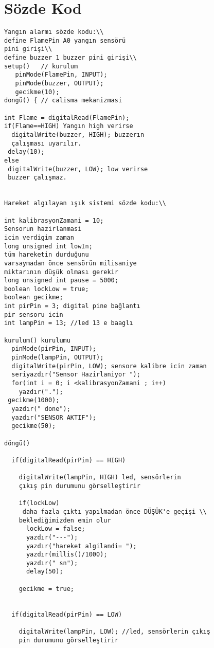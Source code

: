 \documentclass[conference]{IEEEtran}
\begin{document}
\section{Sözde Kod}
\begin{verbatim}
Yangın alarmı sözde kodu:\\
define FlamePin A0 yangın sensörü 
pini girişi\\
define buzzer 1 buzzer pini girişi\\
setup()   // kurulum
   pinMode(FlamePin, INPUT); 
   pinMode(buzzer, OUTPUT);
   gecikme(10);  
dongü() { // calisma mekanizmasi

int Flame = digitalRead(FlamePin);
if(Flame==HIGH) Yangın high verirse
  digitalWrite(buzzer, HIGH); buzzerın 
  çalışması uyarılır.
 delay(10);
else
 digitalWrite(buzzer, LOW); low verirse 
 buzzer çalışmaz.


Hareket algılayan ışık sistemi sözde kodu:\\

int kalibrasyonZamani = 10;
Sensorun hazirlanmasi 
icin verdigim zaman 
long unsigned int lowIn; 
tüm hareketin durduğunu 
varsaymadan önce sensörün milisaniye 
miktarının düşük olması gerekir
long unsigned int pause = 5000; 
boolean lockLow = true; 
boolean gecikme; 
int pirPin = 3; digital pine bağlantı 
pir sensoru icin
int lampPin = 13; //led 13 e baaglı

kurulum() kurulumu
  pinMode(pirPin, INPUT); 
  pinMode(lampPin, OUTPUT); 
  digitalWrite(pirPin, LOW); sensore kalibre icin zaman
  seriyazdır("Sensor Hazirlaniyor "); 
  for(int i = 0; i <kalibrasyonZamani ; i++)
    yazdır("."); 
 gecikme(1000); 
  yazdır(" done"); 
  yazdır("SENSOR AKTIF"); 
  gecikme(50); 

döngü()
   
  if(digitalRead(pirPin) == HIGH)    
        
    digitalWrite(lampPin, HIGH) led, sensörlerin 
    çıkış pin durumunu görselleştirir
    
    if(lockLow)      
     daha fazla çıktı yapılmadan önce DÜŞÜK'e geçişi \\
    beklediğimizden emin olur        
      lockLow = false; 
      yazdır("---");        
      yazdır("hareket algilandi= "); 
      yazdır(millis()/1000); 
      yazdır(" sn"); 
      delay(50);      
    
    gecikme = true; 
  
    
  if(digitalRead(pirPin) == LOW)    
        
    digitalWrite(lampPin, LOW); //led, sensörlerin çıkış 
    pin durumunu görselleştirir
    

\end{verbatim}
\end{document}
